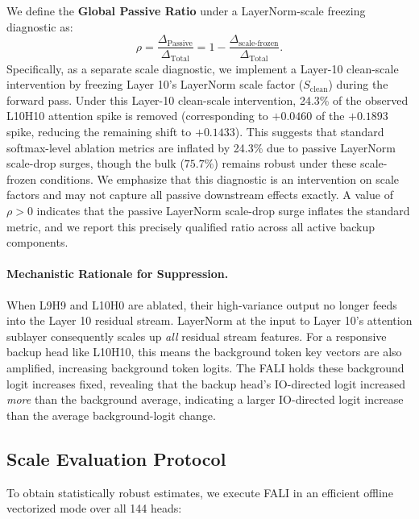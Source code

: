 \documentclass[12pt,a4paper]{article}
\begin{document}
We define the \textbf{Global Passive Ratio} under a LayerNorm-scale freezing diagnostic as:
\begin{equation}
  \rho = \frac{\Delta_\text{Passive}}{\Delta_\text{Total}} = 1 - \frac{\Delta_\text{scale-frozen}}{\Delta_\text{Total}}.
  \label{eq:ratio}
\end{equation}
Specifically, as a separate scale diagnostic, we implement a Layer-10 clean-scale intervention by freezing Layer 10's LayerNorm scale factor ($S_\text{clean}$) during the forward pass. Under this Layer-10 clean-scale intervention, 24.3\% of the observed L10H10 attention spike is removed (corresponding to $+0.0460$ of the $+0.1893$ spike, reducing the remaining shift to $+0.1433$). This suggests that standard softmax-level ablation metrics are inflated by 24.3\% due to passive LayerNorm scale-drop surges, though the bulk ($75.7\%$) remains robust under these scale-frozen conditions. We emphasize that this diagnostic is an intervention on scale factors and may not capture all passive downstream effects exactly. A value of $\rho > 0$ indicates that the passive LayerNorm scale-drop surge inflates the standard metric, and we report this precisely qualified ratio across all active backup components.

\paragraph{Mechanistic Rationale for Suppression.} When L9H9 and L10H0 are
ablated, their high-variance output no longer feeds into the Layer 10 residual
stream. LayerNorm at the input to Layer 10's attention sublayer consequently
scales up \emph{all} residual stream features. For a responsive backup head like
L10H10, this means the background token key vectors are also amplified,
increasing background token logits. The FALI holds these background logit
increases fixed, revealing that the backup head's IO-directed logit increased
\emph{more} than the background average, indicating a larger IO-directed logit increase than the average background-logit change.

\subsection{Scale Evaluation Protocol}
\label{subsec:scale}

To obtain statistically robust estimates, we execute FALI in an efficient
offline vectorized mode over all 144 heads:
\end{document}
